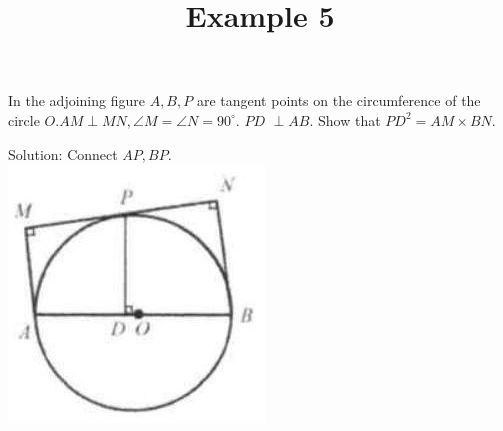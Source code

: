 \documentclass{article}
\title{Example 5}
\date{}
\begin{document}
\maketitle

In the adjoining figure \(A, B, P\) are tangent points on the circumference of the circle \(O . A M \perp M N, \angle M=\angle N=90^{\circ}\). \(P D\) \(\perp A B\). Show that \(P D^{2}=A M \times B N\).

Solution:
Connect \(A P, B P\).\\
\centering
\includegraphics[width=\textwidth]{images/problem_image_1.jpg}
\end{document}
